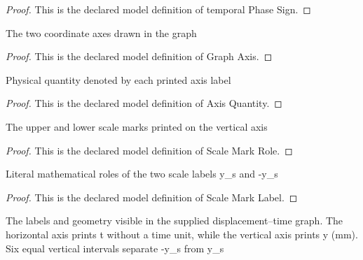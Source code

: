 \begin{proof}
  This is the declared model definition of temporal Phase Sign.
\end{proof}
\begin{definition}
  \label{def:physics:phyx-mini-0300:phyxminiproblems-problemphyxmini0300-graphaxis}
  The two coordinate axes drawn in the graph
\end{definition}
\begin{proof}
  This is the declared model definition of Graph Axis.
\end{proof}
\begin{definition}
  \label{def:physics:phyx-mini-0300:phyxminiproblems-problemphyxmini0300-axisquantity}
  Physical quantity denoted by each printed axis label
\end{definition}
\begin{proof}
  This is the declared model definition of Axis Quantity.
\end{proof}
\begin{definition}
  \label{def:physics:phyx-mini-0300:phyxminiproblems-problemphyxmini0300-scalemarkrole}
  The upper and lower scale marks printed on the vertical axis
\end{definition}
\begin{proof}
  This is the declared model definition of Scale Mark Role.
\end{proof}
\begin{definition}
  \label{def:physics:phyx-mini-0300:phyxminiproblems-problemphyxmini0300-scalemarklabel}
  Literal mathematical roles of the two scale labels y\_s and -y\_s
\end{definition}
\begin{proof}
  This is the declared model definition of Scale Mark Label.
\end{proof}
\begin{definition}
  \label{def:physics:phyx-mini-0300:phyxminiproblems-problemphyxmini0300-displacementtimegraph}
  The labels and geometry visible in the supplied displacement--time graph. The horizontal axis prints t without a time unit, while the vertical axis prints y (mm). Six equal vertical intervals separate -y\_s from y\_s
\end{definition}

